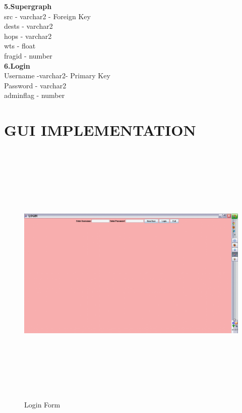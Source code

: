 \begin{center}
\vspace{0.2in}
\textbf{5.Supergraph} 
\\ \hspace*{1cm}src - varchar2 - Foreign Key \\
\hspace*{1cm}dests - varchar2\\
\hspace*{1cm}hops - varchar2 \\
\hspace*{1cm}wts - float \\
\hspace*{1cm}fragid - number\\

\vspace{0.2in}
\textbf{6.Login} 
\\ \hspace*{1cm}Username -varchar2- Primary Key \\
\hspace*{1cm}Password - varchar2\\
\hspace*{1cm}adminflag - number \\



\section{\normalsize GUI IMPLEMENTATION}
\begin{figure}[H]
\includegraphics[width=16cm,height=13cm]{login.eps}
\caption{Login Form}
\end{figure}


\end{center}
